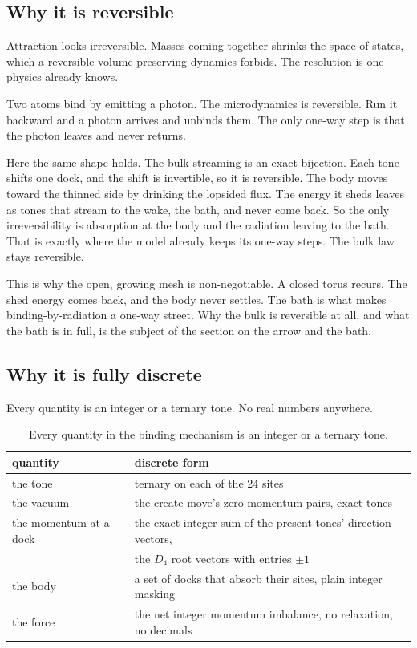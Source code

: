 \subsection{Why it is reversible}

Attraction looks irreversible. Masses coming together shrinks the space of states, which a reversible volume-preserving dynamics forbids. The resolution is one physics already knows.

\begin{principle}
Two atoms bind by emitting a photon. The microdynamics is reversible. Run it backward and a photon arrives and unbinds them. The only one-way step is that the photon leaves and never returns.
\end{principle}

Here the same shape holds. The bulk streaming is an exact bijection. Each tone shifts one dock, and the shift is invertible, so it is reversible. The body moves toward the thinned side by drinking the lopsided flux. The energy it sheds leaves as tones that stream to the wake, the bath, and never come back. So the only irreversibility is absorption at the body and the radiation leaving to the bath. That is exactly where the model already keeps its one-way steps. The bulk law stays reversible.

This is why the open, growing mesh is non-negotiable. A closed torus recurs. The shed energy comes back, and the body never settles. The bath is what makes binding-by-radiation a one-way street. Why the bulk is reversible at all, and what the bath is in full, is the subject of the section on the arrow and the bath.

\subsection{Why it is fully discrete}

Every quantity is an integer or a ternary tone. No real numbers anywhere.

\begin{table}[ht]
\centering
\begin{tabular}{@{}ll@{}}
\toprule
quantity & discrete form \\
\midrule
the tone & ternary on each of the 24 sites \\
the vacuum & the create move's zero-momentum pairs, exact tones \\
the momentum at a dock & the exact integer sum of the present tones' direction vectors, \\
 & the $D_4$ root vectors with entries $\pm 1$ \\
the body & a set of docks that absorb their sites, plain integer masking \\
the force & the net integer momentum imbalance, no relaxation, no decimals \\
\bottomrule
\end{tabular}
\caption{Every quantity in the binding mechanism is an integer or a ternary tone.}
\label{tab:self-binding-discrete}
\end{table}

